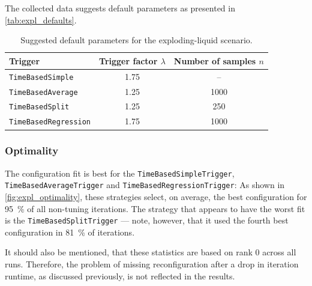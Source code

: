 The collected data suggests default parameters as presented in \autoref{tab:expl_defaults}.
\begin{table}[htpb]
	\centering
	\begin{tabular}{lcc}
		\toprule
		\textbf{Trigger}             & \textbf{Trigger factor $\lambda$} & \textbf{Number of samples $n$} \\ [0em]
		\midrule
		\texttt{TimeBasedSimple}     & 1.75                              & --                             \\
		\texttt{TimeBasedAverage}    & 1.25                              & 1000                           \\
		\texttt{TimeBasedSplit}      & 1.25                              & 250                            \\
		\texttt{TimeBasedRegression} & 1.75                              & 1000                           \\
		\bottomrule
	\end{tabular}
	\caption{Suggested default parameters for the exploding-liquid scenario.}
	\label{tab:expl_defaults}
\end{table}

\subsubsection{Optimality}
The configuration fit is best for the \texttt{TimeBasedSimpleTrigger}, \texttt{TimeBasedAverageTrigger} and \texttt{TimeBasedRegressionTrigger}: As shown in \autoref{fig:expl_optimality}, these strategies select, on average, the best configuration for \qty{95}{\percent} of all non-tuning iterations. The strategy that appears to have the worst fit is the \texttt{TimeBasedSplitTrigger} --- note, however, that it used the fourth best configuration in \qty{81}{\percent} of iterations.

It should also be mentioned, that these statistics are based on rank 0 across all runs. Therefore, the problem of missing reconfiguration after a drop in iteration runtime, as discussed previously, is not reflected in the results.

